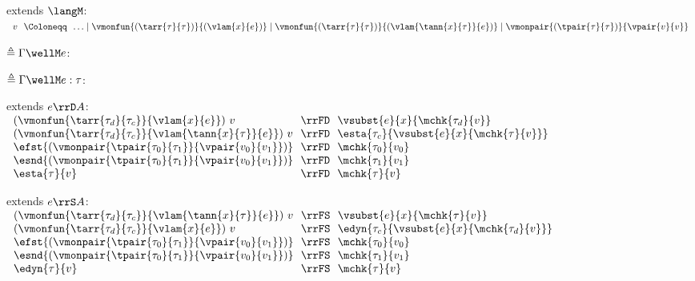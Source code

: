 \begin{flushleft}

 extends $\langM$:\\
$\begin{array}{l@{~~}c@{~~}l}
  v & \Coloneqq & \ldots \mid \vmonfun{(\tarr{\tau}{\tau})}{(\vlam{x}{e})} \mid
      \vmonfun{(\tarr{\tau}{\tau})}{(\vlam{\tann{x}{\tau}}{e})} \mid
      \vmonpair{(\tpair{\tau}{\tau})}{\vpair{v}{v}}
\end{array}$

\bigskip
\begin{minipage}[t]{\columnwidth}
 $\triangleq \Gamma \wellM e$:
\end{minipage}%
\begin{minipage}[t]{\columnwidth}
 $\triangleq \Gamma \wellM e : \tau$:
\end{minipage}


\medskip
\begin{minipage}[t]{\columnwidth}
 extends $e \rrD A$:\\
$\begin{array}{l@{~~}c@{~~}l}
  (\vmonfun{\tarr{\tau_d}{\tau_c}}{\vlam{x}{e}})~v & \rrFD & \vsubst{e}{x}{\mchk{\tau_d}{v}}
\\
  (\vmonfun{\tarr{\tau_d}{\tau_c}}{\vlam{\tann{x}{\tau}}{e}})~v & \rrFD & \esta{\tau_c}{\vsubst{e}{x}{\mchk{\tau}{v}}}
\\
  \efst{(\vmonpair{\tpair{\tau_0}{\tau_1}}{\vpair{v_0}{v_1}})} & \rrFD & \mchk{\tau_0}{v_0}
\\
  \esnd{(\vmonpair{\tpair{\tau_0}{\tau_1}}{\vpair{v_0}{v_1}})} & \rrFD & \mchk{\tau_1}{v_1}
\\
  \esta{\tau}{v} & \rrFD & \mchk{\tau}{v}
\end{array}$
\end{minipage}%
\begin{minipage}[t]{\columnwidth}
 extends $e \rrS A$:\\
$\begin{array}{l@{~~}c@{~~}l}
  (\vmonfun{\tarr{\tau_d}{\tau_c}}{\vlam{\tann{x}{\tau}}{e}})~v & \rrFS & \vsubst{e}{x}{\mchk{\tau}{v}}
\\
  (\vmonfun{\tarr{\tau_d}{\tau_c}}{\vlam{x}{e}})~v & \rrFS & \edyn{\tau_c}{\vsubst{e}{x}{\mchk{\tau_d}{v}}}
\\
  \efst{(\vmonpair{\tpair{\tau_0}{\tau_1}}{\vpair{v_0}{v_1}})} & \rrFS & \mchk{\tau_0}{v_0}
\\
  \esnd{(\vmonpair{\tpair{\tau_0}{\tau_1}}{\vpair{v_0}{v_1}})} & \rrFS & \mchk{\tau_1}{v_1}
\\
  \edyn{\tau}{v} & \rrFS & \mchk{\tau}{v}
\end{array}$
\end{minipage}


\end{flushleft}

